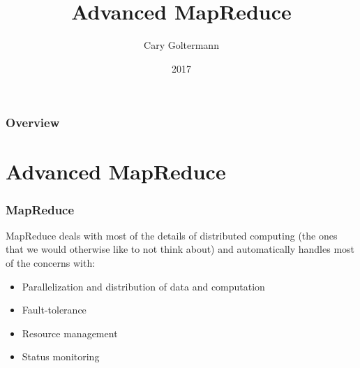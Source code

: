 \documentclass{beamer}
\title{Advanced MapReduce}
\author{Cary Goltermann}
\institute{Galvanize}
\date{2017}
\begin{document}
 
\frame{\titlepage}

\begin{frame}
  \frametitle{Overview}
  \tableofcontents[]
\end{frame}

\section{Advanced MapReduce}
\begin{frame}
  \frametitle{MapReduce}
  \parbox{\linewidth}{MapReduce deals with most of the details of distributed computing (the ones that we would otherwise like to not think about) and automatically handles most of the concerns with:}
  \vspace{4mm}
  \begin{itemize}
    \item Parallelization and distribution of data and computation
    \item Fault-tolerance
    \item Resource management
    \item Status monitoring
  \end{itemize}
\end{frame}
\end{document}
